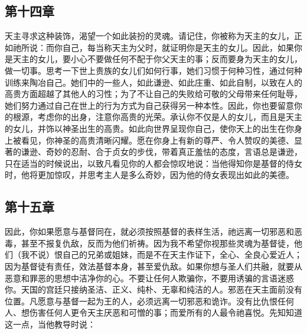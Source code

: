 
\subsection{第十四章}

天主寻求这种装饰，渴望一个如此装扮的灵魂。请记住，你被称为天主的女儿，正如祂所说：而你自己，每当称天主为父时，就证明你是天主的女儿。因此，如果你是天主的女儿，要小心不要做任何不配于你父天主的事；反而要身为天主的女儿，做一切事。思考一下世上贵族的女儿们如何行事，她们习惯于何种习性，通过何种训练来陶冶自己。她们中的一些人，如此谦逊、如此庄重、如此自制，以致在人的高贵方面超越了其他人的习性；为了不让自己的失败给可敬的父母带来任何耻辱，她们努力通过自己在世上的行为方式为自己获得另一种本性。因此，你也要留意你的根源，考虑你的出身，注意你高贵的光荣。承认你不仅是人的女儿，而且是天主的女儿，并饰以神圣出生的高贵。如此向世界呈现你自己，使你天上的出生在你身上被看见，你神圣的高贵清晰闪耀。愿在你身上有新的尊严、令人赞叹的美德、显著的谦逊、奇妙的忍耐、合于贞女的步伐，带着真正羞怯的态度，言语总是谦逊，只在适当的时候说出，以致凡看见你的人都会惊叹地说：当他得知你是基督的侍女时，他将更加惊叹，并思考主人是多么奇妙，因为他的侍女表现出如此的美德。\par


\subsection{第十五章}

因此，你如果愿意与基督同在，就必须按照基督的表样生活，祂远离一切邪恶和恶毒，甚至不报复仇敌，反而为他们祈祷。因为我不希望你视那些灵魂为基督徒，他们（我不说）恨自己的兄弟或姐妹，而是不在天主作证下，全心、全良心爱近人；因为基督徒有责任，效法基督本身，甚至爱仇敌。如果你想与圣人们共融，就要从恶意和罪恶的思想中洁净你的心。不要让任何人欺骗你，不要用诱骗的言语迷惑你。天国的宫廷只接纳圣洁、正义、纯朴、无辜和纯洁的人。邪恶在天主面前没有位置。凡愿意与基督一起为王的人，必须远离一切邪恶和诡诈。没有比仇恨任何人、想伤害任何人更令天主厌恶和可憎的事；而爱所有的人最令祂喜悦。先知知道这一点，当他教导时说：\par

